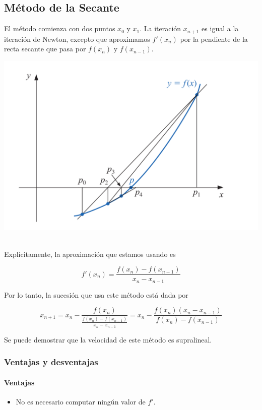 \subsection{Método de la Secante}

El método comienza con dos puntos $x_0$ y $x_1$. La iteración $x_{n + 1}$ es igual a la iteración de Newton, excepto que aproximamos $f'(x_n)$ por la pendiente de la recta secante que pasa por $f(x_{n})$ y $f(x_{n - 1})$.

\begin{center}
	\includegraphics[scale = 0.23]{imagenes/secante.png}~\\[0.25cm]
\end{center}

Explícitamente, la aproximación que estamos usando es

\[f'(x_n) = \frac{f(x_n) - f(x_{n - 1})}{x_n - x_{n - 1}}\]

Por lo tanto, la sucesión que usa este método está dada por

\[x_{n + 1} = x_n - \frac{f(x_n)}{\frac{f(x_n) - f(x_{n - 1})}{x_n - x_{n - 1}}} = x_n - \frac{f(x_n)(x_n - x_{n - 1})}{f(x_n) - f(x_{n - 1})}\]

Se puede demostrar que la velocidad de este método es supralineal.

\subsubsection{Ventajas y desventajas}

\paragraph{Ventajas}
\begin{itemize}
\item No es necesario computar ningún valor de $f'$.
\end{itemize}


